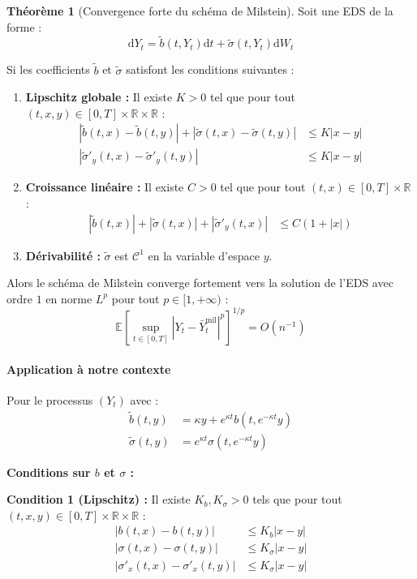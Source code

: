 \documentclass[12pt,a4paper]{article}
\theoremstyle{definition}
\newtheorem{theorem}{Théorème}[section]
\theoremstyle{remark}
\newcommand{\R}{\mathbb{R}}
\newcommand{\E}{\mathbb{E}}
\newcommand{\dd}{\mathrm{d}}
\newcommand{\supt}[1]{\sup_{t \in #1}}
\begin{document}
\begin{theorem}[Convergence forte du schéma de Milstein]
Soit une EDS de la forme :
\[
\dd Y_t = \tilde{b}(t,Y_t)\dd t + \tilde{\sigma}(t,Y_t)\dd W_t
\]

Si les coefficients $\tilde{b}$ et $\tilde{\sigma}$ satisfont les conditions suivantes :
\begin{enumerate}[label=(\roman*)]
\item \textbf{Lipschitz globale :} Il existe $K > 0$ tel que pour tout $(t,x,y) \in [0,T] \times \R \times \R$ :
\begin{align*}
|\tilde{b}(t,x) - \tilde{b}(t,y)| + |\tilde{\sigma}(t,x) - \tilde{\sigma}(t,y)| &\leq K|x-y| \\
|\tilde{\sigma}'_y(t,x) - \tilde{\sigma}'_y(t,y)| &\leq K|x-y|
\end{align*}

\item \textbf{Croissance linéaire :} Il existe $C > 0$ tel que pour tout $(t,x) \in [0,T] \times \R$ :
\begin{align*}
|\tilde{b}(t,x)| + |\tilde{\sigma}(t,x)| + |\tilde{\sigma}'_y(t,x)| &\leq C(1 + |x|)
\end{align*}

\item \textbf{Dérivabilité :} $\tilde{\sigma}$ est $\mathcal{C}^1$ en la variable d'espace $y$.
\end{enumerate}

Alors le schéma de Milstein converge fortement vers la solution de l'EDS avec ordre $1$ en norme $L^p$ pour tout $p \in [1,+\infty)$ :
\[
\E\left[\supt{[0,T]} |Y_t - \bar{Y}_t^{\text{mil}}|^p\right]^{1/p} = O(n^{-1})
\]
\end{theorem}

\paragraph{Application à notre contexte}

Pour le processus $(Y_t)$ avec :
\begin{align*}
\tilde{b}(t,y) &= \kappa y + e^{\kappa t}b(t, e^{-\kappa t}y) \\
\tilde{\sigma}(t,y) &= e^{\kappa t}\sigma(t, e^{-\kappa t}y)
\end{align*}

\textbf{Conditions sur $b$ et $\sigma$ :}

\textbf{Condition 1 (Lipschitz) :} Il existe $K_b, K_\sigma > 0$ tels que pour tout $(t,x,y) \in [0,T] \times \R \times \R$ :
\begin{align}
|b(t,x) - b(t,y)| &\leq K_b|x-y| \\
|\sigma(t,x) - \sigma(t,y)| &\leq K_\sigma|x-y| \\
|\sigma'_x(t,x) - \sigma'_x(t,y)| &\leq K_\sigma|x-y|
\end{align}
\end{document}
